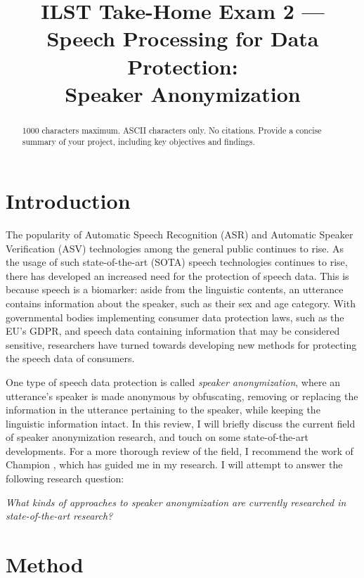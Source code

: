 \documentclass{Interspeech2024}
\title{ILST Take-Home Exam 2 --- \\Speech Processing for Data Protection: \\Speaker Anonymization}
\begin{document}
\maketitle


\begin{abstract}   
    1000 characters maximum. ASCII characters only. No citations. Provide a concise summary of your project, including key objectives and findings. 
\end{abstract}



\section{Introduction}
The popularity of Automatic Speech Recognition (ASR) and Automatic Speaker Verification (ASV) technologies among the general public continues to rise.
As the usage of such state-of-the-art (SOTA) speech technologies continues to rise, there has developed an increased need for the protection of speech data.
This is because speech is a biomarker: aside from the linguistic contents, an utterance contains information about the speaker, such as their sex and age category.
With governmental bodies implementing consumer data protection laws, such as the EU's GDPR, and speech data containing information that may be considered sensitive, researchers have turned towards developing new methods for protecting the speech data of consumers.

One type of speech data protection is called \textit{speaker anonymization}, where an utterance's speaker is made anonymous by obfuscating, removing or replacing the information in the utterance pertaining to the speaker, while keeping the linguistic information intact.
In this review, I will briefly discuss the current field of speaker anonymization research, and touch on some state-of-the-art developments.
For a more thorough review of the field, I recommend the work of Champion \cite{champion_2023_thesis}, which has guided me in my research.
I will attempt to answer the following research question:
\begin{displayquote}
    \textit{What kinds of approaches to speaker anonymization are currently researched in state-of-the-art research?}
\end{displayquote}

\section{Method}
\end{document}
